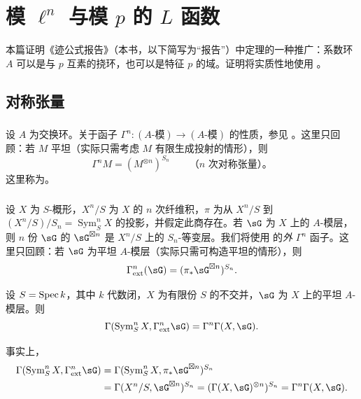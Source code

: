 \chapter{模 \texorpdfstring{$\ell^n$}{l n} 与模 \texorpdfstring{$p$}{p} 的 \texorpdfstring{$L$}{L} 函数}\label{III}
本篇证明《迹公式报告》（本书，以下简写为“报告”）中定理的一种推广：系数环 $A$ 可以是与 $p$ 互素的挠环，也可以是特征 $p$ 的域。证明将实质性地使用 \cite[XVII 5.5]{sga4}。

\section{对称张量}\label{III:1}
\subsection{}\label{III:1-1}
设 $A$ 为交换环。关于函子 $\Gamma^n:(A\text{-模})\to(A\text{-模})$ 的性质，参见 \cite[XVII 5.5.1--2]{sga4}。这里只回顾：若 $M$ 平坦（实际只需考虑 $M$ 有限生成投射的情形），则
\[\Gamma^nM=(M^{\otimes n})^{S_n}\qquad\text{（$n$ 次对称张量）。}\]
这里称为。

\subsection{}\label{III:1-2}
设 $X$ 为 $S$-概形，$X^n/S$ 为 $X$ 的 $n$ 次纤维积，$\pi$ 为从 $X^n/S$ 到 $(X^n/S)/S_n=\operatorname{Sym}_S^nX$ 的投影，并假定此商存在。若 $\sG$ 为 $X$ 上的 $A$-模层，则 $n$ 份 $\sG$ 的 $\sG^{\boxtimes n}$ 是 $X^n/S$ 上的 $S_n$-等变层。我们将使用 \cite[XVII 5.5.7--9]{sga4} 的\emph{外} $\Gamma^n$ 函子。这里只回顾：若 $\sG$ 为平坦 $A$-模层（实际只需可构造平坦的情形），则
\[\Gamma_{\mathrm{ext}}^n(\sG)=(\pi_*\sG^{\boxtimes n})^{S_n}.\]

\begin{lemma_}\label{III:1-3}
设 $S=\operatorname{Spec} k$，其中 $k$ 代数闭，$X$ 为有限份 $S$ 的不交并，$\sG$ 为 $X$ 上的平坦 $A$-模层。则
\[\Gamma(\operatorname{Sym}_S^nX,\Gamma_{\mathrm{ext}}^n\sG)=\Gamma^n\Gamma(X,\sG).\]
\end{lemma_}
事实上，
\begin{align*}
\Gamma(\operatorname{Sym}_S^nX,\Gamma_{\mathrm{ext}}^n\sG)
&=\Gamma(\operatorname{Sym}_S^nX,\pi_*\sG^{\boxtimes n})^{S_n}\\
&=\Gamma(X^n/S,\sG^{\boxtimes n})^{S_n}
=(\Gamma(X,\sG)^{\otimes n})^{S_n}=\Gamma^n\Gamma(X,\sG).
\end{align*}

